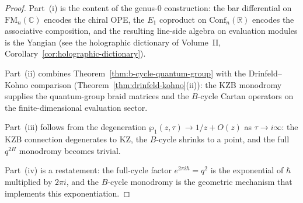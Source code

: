 \begin{proof}
Part~(i) is the content of the genus-$0$ construction: the bar
differential on $\mathrm{FM}_n(\mathbb{C})$ encodes the chiral OPE,
the $E_1$ coproduct on $\mathrm{Conf}_n(\mathbb{R})$ encodes the
associative composition, and the resulting line-side algebra on
evaluation modules is the Yangian (see the holographic dictionary of
Volume~II,
Corollary~\ref*{cor:holographic-dictionary}).

Part~(ii) combines Theorem~\ref{thm:b-cycle-quantum-group} with the
Drinfeld--Kohno comparison (Theorem~\ref{thm:drinfeld-kohno}(ii)): the
KZB monodromy supplies the quantum-group braid matrices and the
$B$-cycle Cartan operators on the finite-dimensional evaluation
sector.

Part~(iii) follows from the degeneration
$\wp_1(z, \tau) \to 1/z + O(z)$ as $\tau \to i\infty$: the KZB
connection degenerates to KZ, the $B$-cycle shrinks to a point, and
the full $q^{2H}$ monodromy becomes trivial.

Part~(iv) is a restatement: the full-cycle factor
$e^{2\pi i \hbar} = q^2$ is the exponential of $\hbar$ multiplied by
$2\pi i$, and the $B$-cycle monodromy is the geometric mechanism that
implements this exponentiation.
\end{proof}

